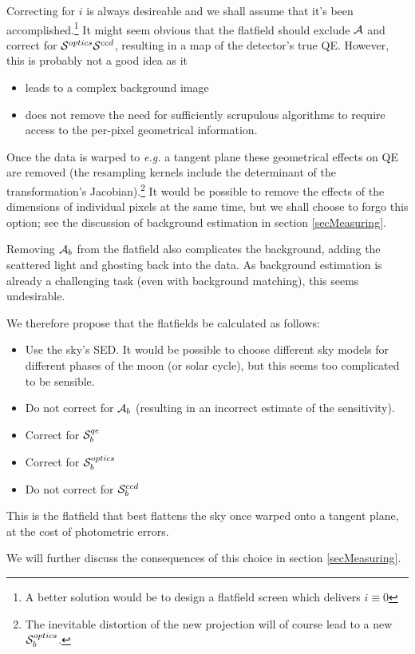 \documentclass[12pt]{article}
\newcommand{\eg}{\textit{e.g.}\xspace}
\newcommand{\additive}{{\cal A}}
\newcommand{\qe}{{\cal S}}
\begin{document}
Correcting for $i$ is always desireable and we shall assume that it's been accomplished.\footnote{A better
  solution would be to design a flatfield screen which delivers $i \equiv 0$} It might seem obvious that the
flatfield should exclude $\additive$ and correct for $\qe^{optics} \qe^{ccd}$, resulting in a map of the
detector's true QE.  However, this is probably not a good idea as it
\begin{itemize}
\item leads to a complex background image
\item does not remove the need for sufficiently scrupulous algorithms to require access to the per-pixel
  geometrical information.
\end{itemize}

Once the data is warped to \eg a tangent plane these geometrical effects on QE are removed (the resampling
kernels include the determinant of the transformation's Jacobian).\footnote{ The inevitable distortion of the
  new projection will of course lead to a new $\qe^{optics}_b$.  } It would be possible to remove the effects
of the dimensions of individual pixels at the same time, but we shall choose to forgo this option; see the
discussion of background estimation in section \ref{secMeasuring}.

Removing $\additive_b$ from the flatfield also complicates the background, adding the scattered light and ghosting
back into the data.  As background estimation is already a challenging task (even with background matching),
this seems undesirable.

We therefore propose that the flatfields be calculated as follows:
\begin{itemize}
  \item Use the sky's SED. It would be possible to choose different sky models for different phases of the moon (or solar cycle), but this seems too complicated to be sensible.
  \item Do not correct for $\additive_b$ (resulting in an incorrect estimate of the sensitivity).
  \item Correct for $\qe_b^{qe}$
  \item Correct for $\qe_b^{optics}$
  \item Do not correct for $\qe_b^{ccd}$
\end{itemize}
This is the flatfield that best flattens the sky once warped onto a tangent plane,
at the cost of photometric errors.

We will further discuss the consequences of this choice in section \ref{secMeasuring}.
\end{document}
